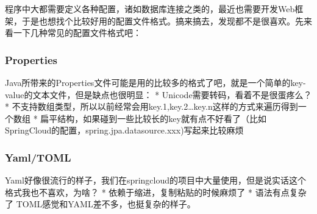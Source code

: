 \documentclass[12pt]{article}
\begin{document}
\makeblogtitle

程序中大都需要定义各种配置，诸如数据库连接之类的，最近也需要开发Web框架，于是也想找个比较好用的配置文件格式。搞来搞去，发现都不是很喜欢。先来看一下几种常见的配置文件格式吧：

\subsubsection{Properties}\label{properties}

Java所带来的Properties文件可能是用的比较多的格式了吧，就是一个简单的key-value的文本文件，但是缺点也很明显： * Unicode需要转码，看着不是很蛋疼么？ * 不支持数组类型，所以以前经常会用key.1,key.2\ldots key.n这样的方式来遍历得到一个数组 * 扁平结构，如果碰到一些比较长的key就有点不好看了（比如SpringCloud的配置，spring.jpa.datasource.xxx)写起来比较麻烦

\begin{Shaded}
\begin{Highlighting}[]
\end{Highlighting}
\end{Shaded}

\subsubsection{Yaml/TOML}\label{yamltoml}

Yaml好像很流行的样子，我们在springcloud的项目中大量使用，但是说实话这个格式我也不喜欢，为啥？ * 依赖于缩进，复制粘贴的时候麻烦了 * 语法有点复杂了 TOML感觉和YAML差不多，也挺复杂的样子。

\begin{Shaded}
\begin{Highlighting}[]
\KeywordTok{:}
\AttributeTok{  }\KeywordTok{:}
\AttributeTok{    }\KeywordTok{:}\AttributeTok{ }
\AttributeTok{    }\KeywordTok{:}\AttributeTok{ }


\KeywordTok{:}
\AttributeTok{  }\KeywordTok{:}
\AttributeTok{    }\KeywordTok{:}
\AttributeTok{      }\KeywordTok{:}
\AttributeTok{        }\KeywordTok{:}
\AttributeTok{          }\KeywordTok{:}
\AttributeTok{            }\KeywordTok{:}\AttributeTok{ }
\end{Highlighting}
\end{Shaded}
\end{document}
